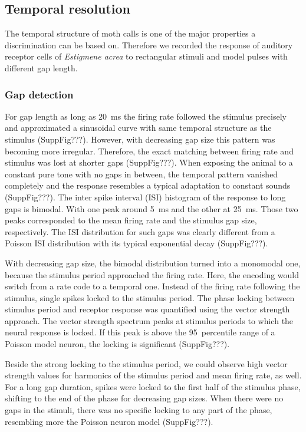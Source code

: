 \documentclass[12pt,a4paper]{article}
\newcommand{\species}[1]{\textit{#1}}
\begin{document}
\subsection{Temporal resolution}
The temporal structure of moth calls is one of the major properties a discrimination can be based on. Therefore we recorded the response of auditory receptor cells of \species{Estigmene acrea} to rectangular stimuli and model pulses with different gap length.

\subsubsection{Gap detection}
For gap length as long as 20~ms the firing rate followed the stimulus precisely and approximated a sinusoidal curve with same temporal structure as the stimulus (SuppFig???). However, with decreasing gap size this pattern was becoming more irregular. Therefore, the exact matching between firing rate and stimulus was lost at shorter gaps (SuppFig???). 
When exposing the animal to a constant pure tone with no gaps in between, the temporal pattern vanished completely and the response resembles a typical adaptation to constant sounds (SuppFig???).
The inter spike interval (ISI) histogram of the response to long gaps is bimodal. With one peak around 5~ms and the other at 25~ms. Those two peaks corresponded to the mean firing rate and the stimulus gap size, respectively. The ISI distribution for such gaps was clearly different from a Poisson ISI distribution with its typical exponential decay (SuppFig???). 

With decreasing gap size, the bimodal distribution turned into a monomodal one, because the stimulus period approached the firing rate. Here, the encoding would switch from a rate code to a temporal one. Instead of the firing rate following the stimulus, single spikes locked to the stimulus period. The phase locking between stimulus period and receptor response was quantified using the vector strength approach. The vector strength spectrum peaks at stimulus periods to which the neural response is locked. If this peak is above the 95~percentile range of a Poisson model neuron, the locking is significant (SuppFig???). 

Beside the strong locking to the stimulus period, we could observe high vector strength values for harmonics of the stimulus period and mean firing rate, as well. For a long gap duration, spikes were locked to the first half of the stimulus phase, shifting to the end of the phase for decreasing gap sizes. When there were no gaps in the stimuli, there was no specific locking to any part of the phase, resembling more the Poisson neuron model (SuppFig???).
\end{document}
